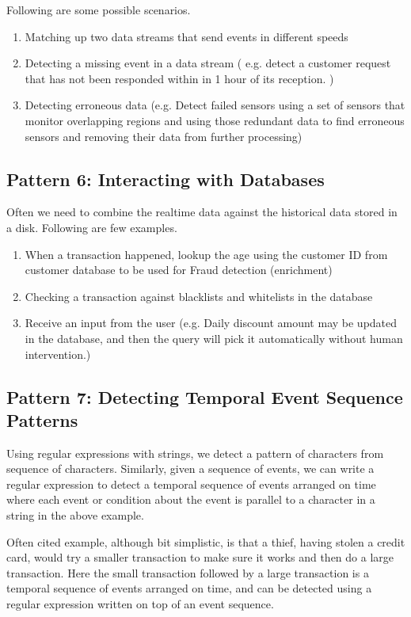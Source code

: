 \documentclass{sig-alternate}
\begin{document}
Following are some possible scenarios. 

\begin{enumerate}
\item Matching up two data streams that send events in different speeds 
\item  Detecting a missing event in a data stream ( e.g. detect a customer request that has not been responded within in 1 hour of its reception. )
\item Detecting erroneous data (e.g. Detect failed sensors using a set of sensors that monitor overlapping regions and using those redundant data to find erroneous sensors and removing their data from further processing) 

\end{enumerate}

\subsection{Pattern 6: Interacting with Databases}
Often we need to combine the realtime data against the historical data stored in a disk. 
Following are few examples. 
\begin{enumerate}
\item When a transaction happened, lookup the age using the customer ID from customer database to be used for Fraud detection (enrichment) 
\item Checking a transaction against blacklists and whitelists in the database 
\item Receive an input from the user (e.g. Daily discount amount may be updated in the database, and then the query will pick it automatically without human intervention.) 
\end{enumerate}


\subsection{Pattern 7: Detecting Temporal Event Sequence Patterns}
Using regular expressions with strings, we detect a pattern of characters from sequence of characters.  Similarly, given a sequence of events, we can write a regular expression to detect a temporal sequence of events arranged on time where each event or condition about the event is parallel to a character in a string in the above example. 

Often cited example, although bit simplistic,  is that a thief,  having stolen a credit card, would try a smaller transaction to make sure it works and then do a large transaction. Here the small transaction followed by a large transaction is a temporal sequence of events arranged on time, and can be detected using a regular expression written on top of an event sequence. 
\end{document}
